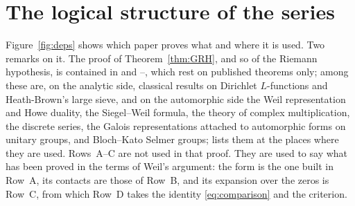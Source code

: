 \documentclass[10pt]{amsart}
\theoremstyle{definition}
\theoremstyle{remark}
\begin{document}
\section{The logical structure of the series}\label{sec:order}
Figure~\ref{fig:deps} shows which paper proves what and where it is used. Two remarks on it. The
proof of Theorem~\ref{thm:GRH}, and so of the Riemann hypothesis, is contained in \cite{P46} and
\cite{P49}--\cite{P56}, which rest on published theorems only; among these are, on the
analytic side, classical results on Dirichlet $L$-functions and Heath-Brown's large sieve, and
on the automorphic side the Weil representation and Howe duality, the Siegel--Weil formula, the
theory of complex multiplication, the discrete series, the Galois representations attached to
automorphic forms on unitary groups, and Bloch--Kato Selmer groups; \cite{P46} lists them at the
places where they are used. Rows~A--C are not used in that proof. They are used to say what has
been proved in the terms of Weil's argument: the form is the one built in Row~A, its
contacts are those of Row~B, and its expansion over the zeros is Row~C, from which Row~D takes
the identity \eqref{eq:comparison} and the criterion.
\end{document}
